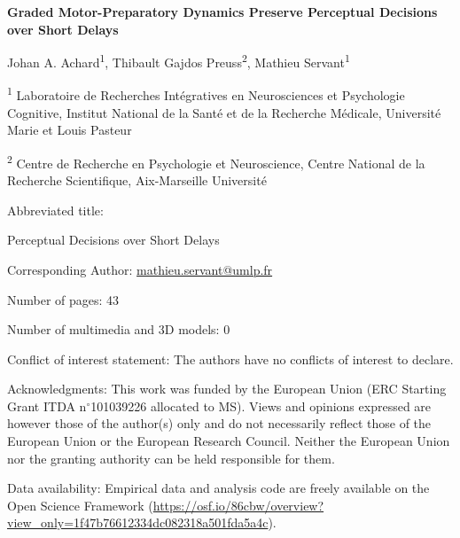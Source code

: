 \textbf{Graded Motor-Preparatory Dynamics Preserve Perceptual Decisions over Short Delays}

Johan A. Achard\textsuperscript{1}, Thibault Gajdos Preuss\textsuperscript{2}, Mathieu Servant\textsuperscript{1}

\textsuperscript{1} Laboratoire de Recherches Int\'egratives en Neurosciences et Psychologie Cognitive, Institut National de la Sant\'e et de la Recherche M\'edicale, Universit\'e Marie et Louis Pasteur

\textsuperscript{2}  Centre de Recherche en Psychologie et Neuroscience, Centre National de la Recherche Scientifique, Aix-Marseille Universit\'e

Abbreviated title:

Perceptual Decisions over Short Delays

Corresponding Author: \url{mathieu.servant@umlp.fr}

Number of pages: 43



Number of multimedia and 3D models: 0




Conflict of interest statement: The authors have no conflicts of interest to  declare.

Acknowledgments:  This work was funded by the European Union (ERC Starting Grant ITDA n$^{\circ}$101039226 allocated to MS). Views and opinions expressed are however those of the author(s) only and do not necessarily reflect those of the European Union or the European Research Council. Neither the European Union nor the granting authority can be held responsible for them.

Data availability: Empirical data and analysis code are freely available on the Open Science Framework  (\url{https://osf.io/86cbw/overview?view\_only=1f47b76612334dc082318a501fda5a4c}).


